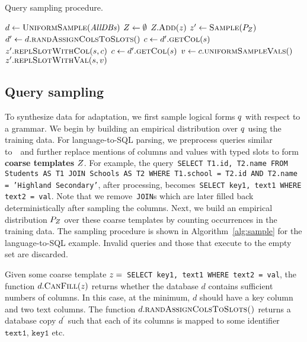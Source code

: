 \documentclass[11pt,a4paper]{article}
\begin{document}
\begin{algorithm}[t]
\caption{Query sampling procedure.}
\label{alg:sample}
\begin{algorithmic}[1]
  \small
  \State $d \gets \textsf{\textsc{UniformSample}}(\mathit{AllDBs})$
  \State ${Z} \gets \emptyset$
      ${Z}.\textsf{\textsc{Add}}({z})$
    \EndIIf
  \EndFor
  \State ${z}^\prime \gets \textsf{\textsc{Sample}}(P_{Z})$
  \State $d^\prime \gets d.\textsf{\textsc{randAssignColsToSlots}}()$
    \State $c \gets d^\prime.\textsf{\textsc{getCol}}(s)$
    \State ${z}^\prime.\textsf{\textsc{replSlotWithCol}}(s, c)$
  \EndFor
    \State $c \gets d^\prime.\textsf{\textsc{getCol}}(s)$
    \State $v \gets c.\textsf{\textsc{uniformSampleVals}}()$
    \State ${z}^\prime.\textsf{\textsc{replSlotWithVal}}(s, v)$
  \EndFor
  
\end{algorithmic}
\end{algorithm}

\subsection{Query sampling}
\label{sec:sampling}

To synthesize data for adaptation, we first sample logical forms ${q}$ with respect to a grammar.
We begin by building an empirical distribution over ${q}$ using the training data.
For language-to-SQL parsing, we preprocess queries similar to~\citet{zhang2019editing}~and further replace mentions of columns and values with typed slots to form \textbf{coarse templates} ${Z}$.
For example, the query~\texttt{SELECT T1.id, T2.name FROM Students AS T1 JOIN Schools AS T2 WHERE T1.school = T2.id AND T2.name = 'Highland Secondary'}, after processing, becomes~\texttt{SELECT key1, text1 WHERE text2 = val}.
Note that we remove~\texttt{JOIN}s which are later filled back deterministically after sampling the columns.
Next, we build an empirical distribution $P_{Z}$ over these coarse templates by counting occurrences in the training data.
The sampling procedure is shown in Algorithm~\ref{alg:sample} for the language-to-SQL example.
Invalid queries and those that execute to the empty set are discarded.

Given some coarse template ${z} =$~\texttt{SELECT key1, text1 WHERE text2 = val}, the function $d.\textsf{\textsc{CanFill}}({z})$ returns whether the database $d$ contains sufficient numbers of columns.
In this case, at the minimum, $d$ should have a key column and two text columns.
The function $d.\textsf{\textsc{randAssignColsToSlots()}}$ returns a database copy $d^\prime$ such that each of its columns is mapped to some identifier $\texttt{text1}$, $\texttt{key1}$ etc.
\end{document}

